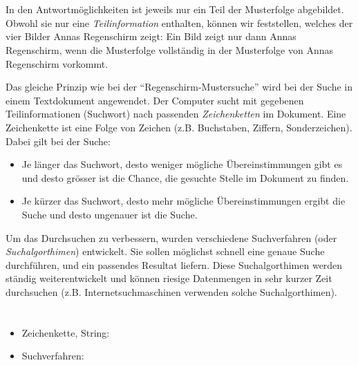 {{%
\section*{\BrochureItsInformatics}
In den Antwortmöglichkeiten ist jeweils nur ein Teil der Musterfolge abgebildet. Obwohl sie nur eine \emph{Teilinformation} enthalten, können wir feststellen, welches der vier Bilder Annas Regenschirm zeigt: Ein Bild zeigt nur dann Annas Regenschirm, wenn die Musterfolge vollständig in der Musterfolge von Annas Regenschirm vorkommt.

Das gleiche Prinzip wie bei der \enquote{Regenschirm-Mustersuche} wird bei der Suche in einem Textdokument angewendet. Der Computer sucht mit gegebenen Teilinformationen (Suchwort) nach passenden \emph{Zeichenketten} im Dokument. Eine Zeichenkette ist eine Folge von Zeichen (z.B. Buchstaben, Ziffern, Sonderzeichen).
Dabei gilt bei der Suche:

\begin{itemize}
  \item Je länger das Suchwort, desto weniger mögliche Übereinstimmungen gibt es und desto grösser ist die Chance, die gesuchte Stelle im Dokument zu finden.
  \item Je kürzer das Suchwort, desto mehr mögliche Übereinstimmungen ergibt die Suche und desto ungenauer ist die Suche.
\end{itemize}

Um das Durchsuchen zu verbessern, wurden verschiedene Suchverfahren (oder \emph{Suchalgorthimen}) entwickelt. Sie sollen möglichst schnell eine genaue Suche durchführen, und ein passendes Resultat liefern. Diese Suchalgorthimen werden ständig weiterentwickelt und können riesige Datenmengen in sehr kurzer Zeit durchsuchen (z.B. Internetsuchmaschinen verwenden solche Suchalgorthimen).



\section*{\BrochureWebsitesAndKeywords}
{\raggedright
\begin{itemize}
  \item Zeichenkette, String: \href{https://de.wikipedia.org/wiki/Zeichenkette}{}
  \item Suchverfahren: \href{https://de.wikipedia.org/wiki/Suchverfahren}{}
\end{itemize}


}}}
